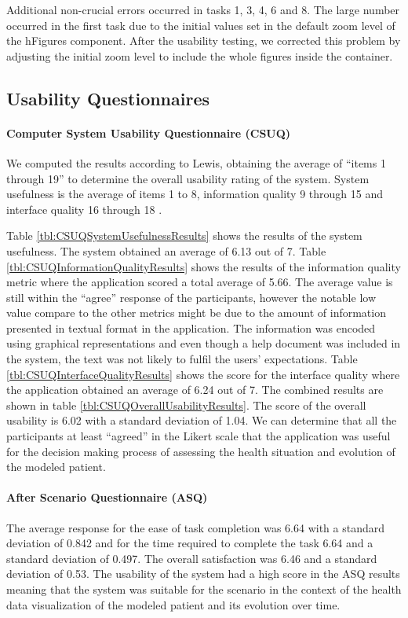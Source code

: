 \documentclass[twocolumn]{bmcart}%
\begin{document}
Additional non-crucial errors occurred in tasks 1, 3, 4, 6 and 8. The large number occurred in the first task due to the initial values set in the default zoom level of the hFigures component. After the usability testing, we corrected this problem by adjusting the initial zoom level to include the whole figures inside the container.

\subsection*{Usability Questionnaires}

\paragraph*{Computer System Usability Questionnaire (CSUQ)}
We computed the results according to Lewis, obtaining the average of ``items 1 through 19'' to determine the overall usability rating of the system. System usefulness is the average of items 1 to 8, information quality 9 through 15 and interface quality 16 through 18 \cite{lewis2002psychometric}.

Table \ref{tbl:CSUQSystemUsefulnessResults} shows the results of the system usefulness. The system obtained an average of 6.13 out of 7. Table \ref{tbl:CSUQInformationQualityResults} shows the results of the information quality metric where the application scored a total average of 5.66. The average value is still within the ``agree'' response of the participants, however the notable low value compare to the other metrics might be due to the amount of information presented in textual format in the application. The information was encoded using graphical representations and even though a help document was included in the system, the text was not likely to fulfil the users' expectations. Table \ref{tbl:CSUQInterfaceQualityResults} shows the score for the interface quality where the application obtained an average of 6.24 out of 7. The combined results are shown in table \ref{tbl:CSUQOverallUsabilityResults}. The score of the overall usability is 6.02 with a standard deviation of 1.04. We can determine that all the participants at least ``agreed'' in the Likert scale that the application was useful for the decision making process of assessing the health situation and evolution of the modeled patient.

\paragraph*{After Scenario Questionnaire (ASQ)} The average response for the ease of task completion was 6.64 with a standard deviation of 0.842 and for the time required to complete the task 6.64 and a standard deviation of 0.497. The overall satisfaction was 6.46 and a standard deviation of 0.53. The usability of the system had a high score in the ASQ results meaning that the system was suitable for the scenario in the context of the health data visualization of the modeled patient and its evolution over time.
\end{document}

